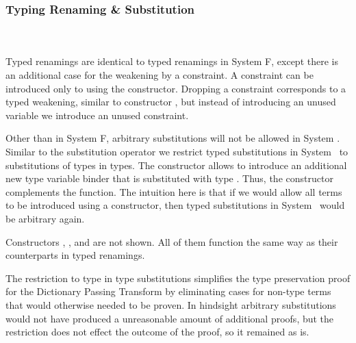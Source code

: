 \subsubsection{Typing Renaming \& Substitution}\hfill\\\\
Typed renamings are identical to typed renamings in System F, except there is an additional case for the weakening by a constraint. 
\FoRenTyping
A constraint  \Constr{:}  can be introduced only to  using the  constructor. 
Dropping a constraint corresponds to a typed weakening, similar to constructor , but instead of introducing an unused variable we introduce an unused constraint.

\noindent Other than in System F, arbitrary substitutions will not be allowed in System \Fo. 
Similar to the substitution operator we restrict typed substitutions in System \Fo\ to substitutions of types in types. 
\FoSubTyping
\noindent The constructor  allows to introduce an additional new type variable binder that is substituted with type .
Thus, the constructor  complements the  function. 
The intuition here is that if we would allow all terms to be introduced using a  constructor, then typed substitutions in System \Fo\ would be arbitrary again. 

\noindent Constructors  , ,  and  are not shown. All of them function the same way as their counterparts in typed renamings.

\noindent The restriction to type in type substitutions simplifies the type preservation proof for the Dictionary Passing Transform by eliminating cases for non-type terms that would otherwise needed to be proven. In hindsight arbitrary substitutions would not have produced a unreasonable amount of additional proofs, but the restriction does not effect the outcome of the proof, so it remained as is.  